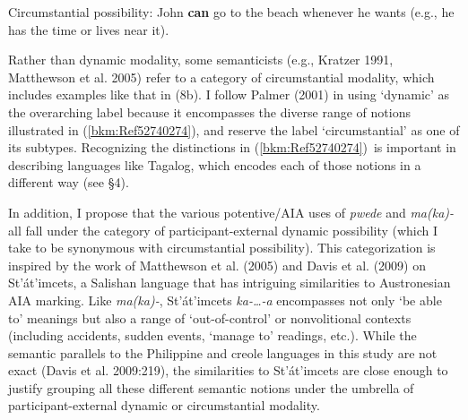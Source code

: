 \setcounter{listWWNumiiileveli}{0}
\begin{listWWNumiiileveli}
\item 

\setcounter{listWWNumiiilevelii}{0}
\begin{listWWNumiiilevelii}
\item 

\setcounter{listWWNumiiileveliii}{0}
\begin{listWWNumiiileveliii}
\item 

\setcounter{listWWNumiiileveliv}{0}
\begin{listWWNumiiileveliv}
\item 
\begin{stylelsSourceline}
\textup{Circumstantial possibility: }John \textbf{can} go to the beach whenever he wants\textup{ (e.g., he has the time or lives near it).}
\end{stylelsSourceline}
\end{listWWNumiiileveliv}
\end{listWWNumiiileveliii}
\end{listWWNumiiilevelii}
\end{listWWNumiiileveli}
\begin{styleStandard}
Rather than dynamic modality, some semanticists (e.g., Kratzer 1991, Matthewson et al. 2005) refer to a category of circumstantial modality, which includes examples like that in (8b). I follow Palmer (2001) in using ‘dynamic’ as the overarching label because it encompasses the diverse range of notions illustrated in (\ref{bkm:Ref52740274}), and reserve the label ‘circumstantial’ as one of its subtypes. Recognizing the distinctions in (\ref{bkm:Ref52740274})\ is important in describing languages like Tagalog, which encodes each of those notions in a different way (see §4). \ 
\end{styleStandard}

\begin{styleStandard}
In addition, I propose that the various potentive/AIA uses of \textit{pwede} and \textit{ma(ka)-} all fall under the category of participant-external dynamic possibility (which I take to be synonymous with circumstantial possibility). This categorization is inspired by the work of Matthewson et al. (2005) and Davis et al. (2009) on St’át’imcets, a Salishan language that has intriguing similarities to Austronesian AIA marking. Like \textit{ma(ka)-}, St’át’imcets \textit{ka-…-a} encompasses not only ‘be able to’ meanings but also a range of ‘out-of-control’ or nonvolitional contexts (including accidents, sudden events, ‘manage to’ readings, etc.). While the semantic parallels to the Philippine and creole languages in this study are not exact (Davis et al. 2009:219), the similarities to St’át’imcets are close enough to justify grouping all these different semantic notions under the umbrella of participant-external dynamic or circumstantial modality. 
\end{styleStandard}

